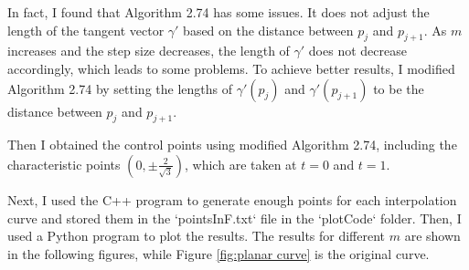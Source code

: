 \documentclass[a4paper]{article}
\begin{document}
In fact, I found that Algorithm 2.74 has some issues. It does not adjust the length of the tangent vector \(\gamma'\) based on the distance between \(p_j\) and \(p_{j+1}\). As \(m\) increases and the step size decreases, the length of \(\gamma'\) does not decrease accordingly, which leads to some problems. To achieve better results, I modified Algorithm 2.74 by setting the lengths of \(\gamma'(p_j)\) and \(\gamma'(p_{j+1})\) to be the distance between \(p_j\) and \(p_{j+1}\).

Then I obtained the control points using modified Algorithm 2.74, including the characteristic points \((0, \pm \frac{2}{\sqrt{3}})\), which are taken at \( t = 0 \) and \( t = 1 \).

Next, I used the C++ program to generate enough points for each interpolation curve and stored them in the `pointsInF.txt` file in the `plotCode` folder. Then, I used a Python program to plot the results. The results for different \(m\) are shown in the following figures, while Figure \ref{fig:planar curve} is the original curve.
\end{document}

